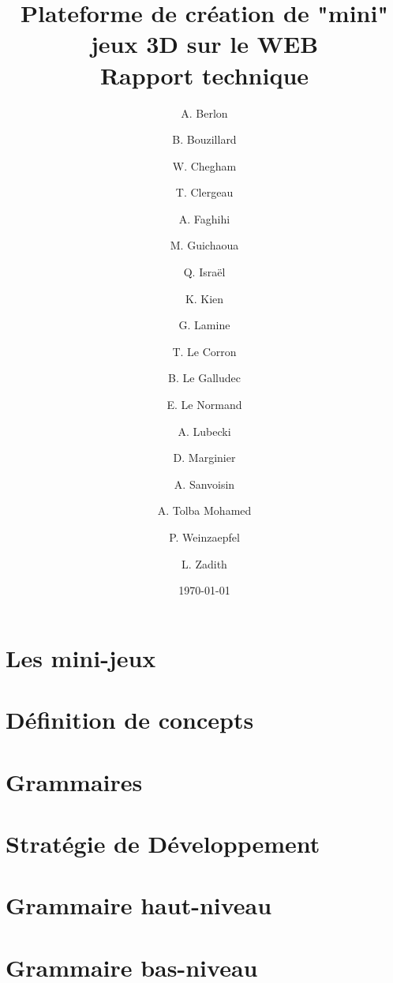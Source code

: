 \documentclass[a4paper,10pt]{article}
\title{Plateforme de création de "mini" jeux 3D sur le WEB \\ Rapport technique}
\author{
A. Berlon \and
B. Bouzillard \and
W. Chegham \and
T. Clergeau \and
A. Faghihi \and
M. Guichaoua \and
Q. Israël \and
K. Kien \and
G. Lamine \and
T. Le Corron \and
B. Le Galludec \and
E. Le Normand \and
A. Lubecki \and
D. Marginier \and
A. Sanvoisin \and
A. Tolba Mohamed \and
P. Weinzaepfel \and
L. Zadith}
\date{\today}
\begin{document}
 
\maketitle

 

\section{Les mini-jeux}
\label{sec:minijeux}


\section{Définition de concepts}
\label{sec:concept}


\section{Grammaires}
\label{sec:grammaire}


\section{Stratégie de Développement}
\label{sec:strategie}


\clearpage
\appendix

\section{Grammaire haut-niveau}
\label{sec:hautniveau}


\section{Grammaire bas-niveau}
\label{sec:basniveau}

\end{document}
